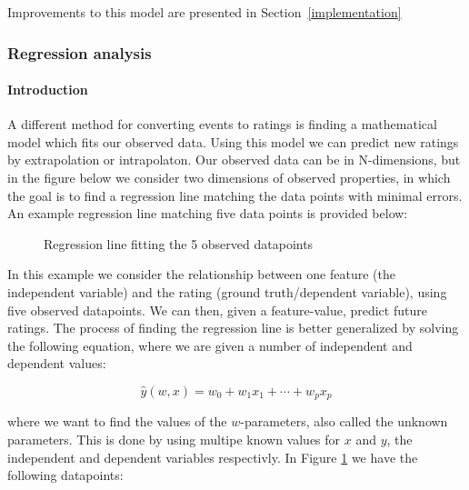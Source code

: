 Improvements to this model are presented in Section~\ref{implementation}

\subsubsection{Regression analysis}

\paragraph{Introduction}
A different method for converting events to ratings is finding a mathematical
model which fits our observed data. Using this model we can predict new ratings
by extrapolation or intrapolaton. Our observed data can be in N-dimensions, but
in the figure below we consider two dimensions of observed properties, in which
the goal is to find a regression line matching the data points with minimal
errors. An example regression line matching five data points is provided below:

\begin{figure}[H]
  \centering
  \label{fig-regression}
  \caption{Regression line fitting the 5 observed datapoints}
\end{figure}

In this example we consider the relationship between one feature (the
independent variable) and the rating (ground truth/dependent variable), using
five observed datapoints. We can then, given a feature-value, predict future
ratings. The process of finding the regression line is better generalized by
solving the following equation, where we are given a number of independent and
dependent values:

\begin{equation}
  \label{eq-regression}
  \hat{y}(w,x) = w_0 + w_1 x_1 + \cdots + w_p x_p
\end{equation}

where we want to find the values of the $w$-parameters, also called the unknown
parameters. This is done by using multipe known values for $x$ and $y$, the
independent and dependent variables respectivly. In Figure \ref{fig-regression}
we have the following datapoints:

